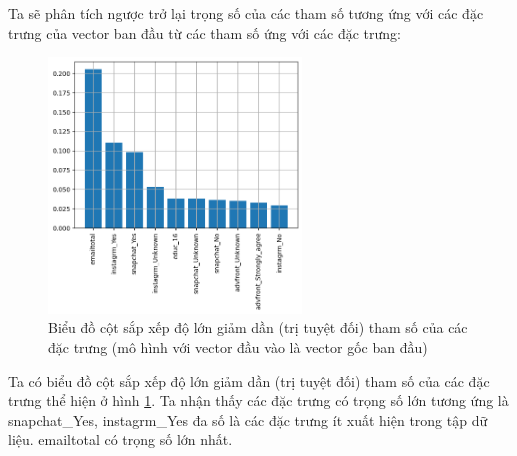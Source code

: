 \begin{enumerate}[label=(\alph*)]
    Ta sẽ phân tích ngược trở lại trọng số của các tham số tương ứng với các đặc trưng của vector ban đầu từ các tham số ứng với các đặc trưng:

    \begin{figure}[H]
        \centering
        \includegraphics[width=0.6\textwidth]{figures/Thanh/Models/Random_Forest/Non_null_models_Feature_Importance_Random_Forest_original_features.png}
        \caption{Biểu đồ cột sắp xếp độ lớn giảm dần (trị tuyệt đối) tham số của các đặc trưng (mô hình với vector đầu vào là vector gốc ban đầu)}
        \label{fig:Non_null_models_Feature_Importance_Random_Forest_original_features}
    \end{figure}

    Ta có biểu đồ cột sắp xếp độ lớn giảm dần (trị tuyệt đối) tham số của các đặc trưng thể hiện ở hình \ref{fig:Non_null_models_Feature_Importance_Random_Forest_original_features}.
    Ta nhận thấy các đặc trưng có trọng số lớn tương ứng là snapchat\_Yes, instagrm\_Yes đa số là các đặc trưng ít xuất hiện trong tập dữ liệu.
    emailtotal có trọng số lớn nhất.
\end{enumerate}